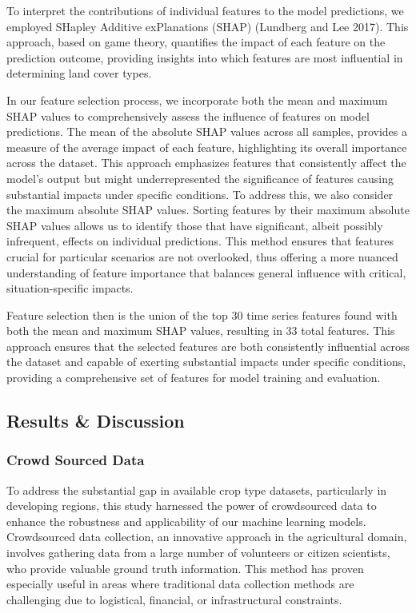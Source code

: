 \documentclass[
  journal,
  twocolumn]{IEEEtran}
\begin{document}
To interpret the contributions of individual features to the model
predictions, we employed SHapley Additive exPlanations (SHAP) (Lundberg
and Lee 2017). This approach, based on game theory, quantifies the
impact of each feature on the prediction outcome, providing insights
into which features are most influential in determining land cover
types.

In our feature selection process, we incorporate both the mean and
maximum SHAP values to comprehensively assess the influence of features
on model predictions. The mean of the absolute SHAP values across all
samples, provides a measure of the average impact of each feature,
highlighting its overall importance across the dataset. This approach
emphasizes features that consistently affect the model's output but
might underrepresented the significance of features causing substantial
impacts under specific conditions. To address this, we also consider the
maximum absolute SHAP values. Sorting features by their maximum absolute
SHAP values allows us to identify those that have significant, albeit
possibly infrequent, effects on individual predictions. This method
ensures that features crucial for particular scenarios are not
overlooked, thus offering a more nuanced understanding of feature
importance that balances general influence with critical,
situation-specific impacts.

Feature selection then is the union of the top 30 time series features
found with both the mean and maximum SHAP values, resulting in 33 total
features. This approach ensures that the selected features are both
consistently influential across the dataset and capable of exerting
substantial impacts under specific conditions, providing a comprehensive
set of features for model training and evaluation.

\hypertarget{results-discussion}{%
\subsection{Results \& Discussion}\label{results-discussion}}

\hypertarget{crowd-sourced-data}{%
\subsubsection{Crowd Sourced Data}\label{crowd-sourced-data}}

To address the substantial gap in available crop type datasets,
particularly in developing regions, this study harnessed the power of
crowdsourced data to enhance the robustness and applicability of our
machine learning models. Crowdsourced data collection, an innovative
approach in the agricultural domain, involves gathering data from a
large number of volunteers or citizen scientists, who provide valuable
ground truth information. This method has proven especially useful in
areas where traditional data collection methods are challenging due to
logistical, financial, or infrastructural constraints.
\end{document}

